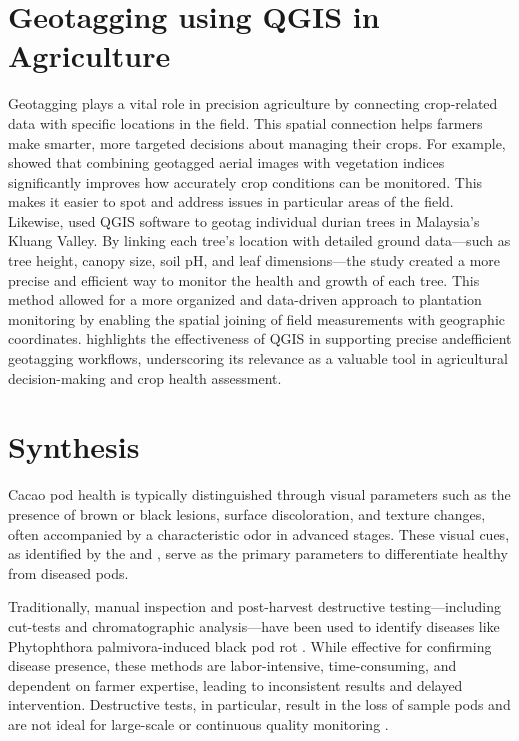 \section{Geotagging using QGIS in Agriculture}
Geotagging plays a vital role in precision agriculture by connecting crop-related data with specific locations in the field. This spatial connection helps farmers make smarter, more targeted decisions about managing their crops. For example, \cite{Mohidem2021} showed that combining geotagged aerial images with vegetation indices significantly improves how accurately crop conditions can be monitored. This makes it easier to spot and address issues in particular areas of the field. Likewise, \cite{Rahman2021} used QGIS software to geotag individual durian trees in Malaysia’s Kluang Valley. By linking each tree’s location with detailed ground data—such as tree height, canopy size, soil pH, and leaf dimensions—the study created a more precise and efficient way to monitor the health and growth of each tree. This method allowed for a more organized and data-driven approach to plantation monitoring by enabling the spatial joining of field measurements with geographic coordinates. \cite{Rahman2021} highlights the effectiveness of QGIS in supporting precise andefficient geotagging workflows, underscoring its relevance as a valuable tool in agricultural decision-making and crop health assessment.

\section{Synthesis}

Cacao pod health is typically distinguished through visual parameters such as the presence of brown or black lesions, surface discoloration, and texture changes, often accompanied by a characteristic odor in advanced stages. These visual cues, as identified by the \cite{PhilCacaoRoadmap2021}and \cite{PCAF2021}, serve as the primary parameters to differentiate healthy from diseased pods.

Traditionally, manual inspection and post-harvest destructive testing—including cut-tests and chromatographic analysis—have been used to identify diseases like Phytophthora palmivora-induced black pod rot \citep{AceboGuerrero2012, Aneani2007}. While effective for confirming disease presence, these methods are labor-intensive, time-consuming, and dependent on farmer expertise, leading to inconsistent results and delayed intervention. Destructive tests, in particular, result in the loss of sample pods and are not ideal for large-scale or continuous quality monitoring \citep{Nguyen2022, Quelal2020}.

